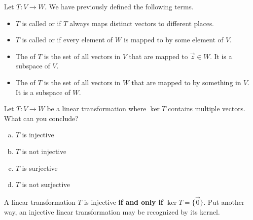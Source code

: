 \begin{applicationActivities}

\begin{observation}
Let \(T: V \rightarrow W\).  We have previously defined the following
terms.
\begin{itemize}
\item  \(T\) is called  or  if \(T\) always maps  distinct vectors to different places.
\item \(T\) is called  or  if every element of \(W\) is mapped to by some element of \(V\).
\item The  of \(T\) is the set of all vectors in \(V\) that are mapped to $\vec{z}\in W$.  It is a subspace of \(V\).
\item The  of \(T\) is the set of all vectors in \(W\) that are mapped to by something in \(V\).  It is a subspace of \(W\).
\end{itemize}
\end{observation}

\begin{activity}{5}
Let \(T: V \rightarrow W\) be a linear transformation where
\(\ker T\) contains multiple vectors. What can you conclude?
\begin{enumerate}[(a)]
\item \(T\) is injective
\item \(T\) is not injective
\item \(T\) is surjective
\item \(T\) is not surjective
\end{enumerate}
\end{activity}

\begin{fact}
A linear transformation $T$ is injective \textbf{if and only if} $\ker T = \{\vec{0}\}$. Put another way, an injective linear transformation may be
recognized by its  kernel.


\end{fact}
\end{applicationActivities}
